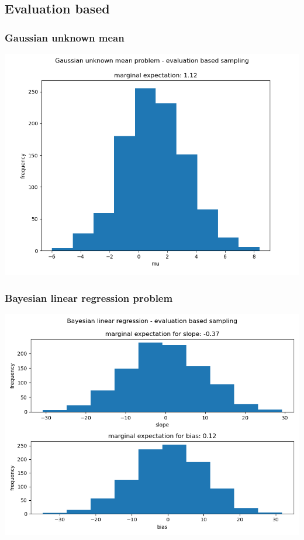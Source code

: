 \documentclass[10pt]{homeworg}
\begin{document}
\subsection{Evaluation based}
\subsubsection{Gaussian unknown mean}
\begin{center}
\includegraphics[scale=0.5]{figures/evaluation_1.png}
\end{center}

\subsubsection{Bayesian linear regression problem}
\begin{center}
\includegraphics[scale=0.5]{figures/evaluation_2}
\end{center}
\end{document}
